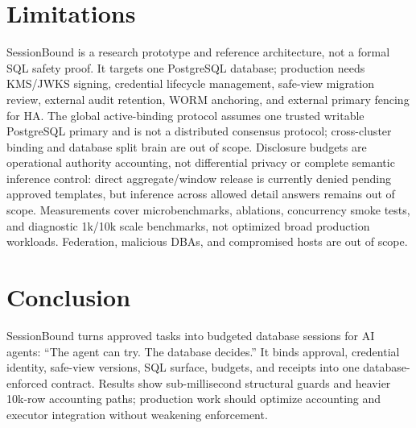 \documentclass[journal]{IEEEtran}
\begin{document}
\hypertarget{limitations}{%
\section{Limitations}\label{limitations}}

SessionBound is a research prototype and reference architecture, not a
formal SQL safety proof. It targets one PostgreSQL database; production
needs KMS/JWKS signing, credential lifecycle management, safe-view
migration review, external audit retention, WORM anchoring, and external
primary fencing for HA. The global active-binding protocol assumes one
trusted writable PostgreSQL primary and is not a distributed consensus
protocol; cross-cluster binding and database split brain are out of
scope.
Disclosure budgets are operational authority accounting, not
differential privacy or complete semantic inference control:
direct aggregate/window release is currently denied pending approved
templates, but inference across allowed detail answers remains out of
scope. Measurements cover microbenchmarks, ablations, concurrency
smoke tests, and diagnostic 1k/10k scale benchmarks, not optimized
broad production workloads. Federation, malicious DBAs, and compromised
hosts are out of scope.

\hypertarget{conclusion}{%
\section{Conclusion}\label{conclusion}}

SessionBound turns approved tasks into budgeted database sessions for AI
agents: ``The agent can try. The database decides.'' It binds approval,
credential identity, safe-view versions, SQL surface, budgets, and
receipts into one database-enforced contract. Results show
sub-millisecond structural guards and heavier 10k-row accounting paths;
production work should optimize accounting and executor integration
without weakening enforcement.

\enlargethispage{5\baselineskip}
\vspace{-0.8em}
{\scriptsize
\def\BIBdecl{\fontsize{7}{7.0}\selectfont}


}
\end{document}
